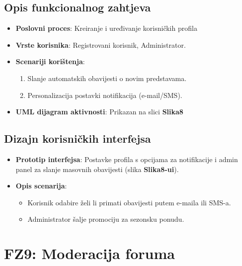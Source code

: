 \subsection{Opis funkcionalnog zahtjeva}  
\begin{itemize}  
    \item \textbf{Poslovni proces}: Kreiranje i uređivanje korisničkih profila  
    \item \textbf{Vrste korisnika}: Registrovani korisnik, Administrator.  
    \item \textbf{Scenariji korištenja}:  
        \begin{enumerate}  
            \item Slanje automatskih obavijesti o novim predstavama.  
            \item Personalizacija postavki notifikacija (e-mail/SMS).  
        \end{enumerate}  
    \item \textbf{UML dijagram aktivnosti}: Prikazan na slici \textbf{Slika8}  
\end{itemize}  

\sloppy  
\subsection{Dizajn korisničkih interfejsa}  
\begin{itemize}  
    \item \textbf{Prototip interfejsa}: Postavke profila s opcijama za notifikacije i admin panel za slanje masovnih obavijesti (slika \textbf{Slika8-ui}).  
    \item \textbf{Opis scenarija}:  
        \begin{itemize}  
            \item Korisnik odabire želi li primati obavijesti putem e-maila ili SMS-a.  
            \item Administrator šalje promociju za sezonsku ponudu.  
        \end{itemize}  
\end{itemize}  

\sloppy  
\section{FZ9: Moderacija foruma}  

\sloppy  
